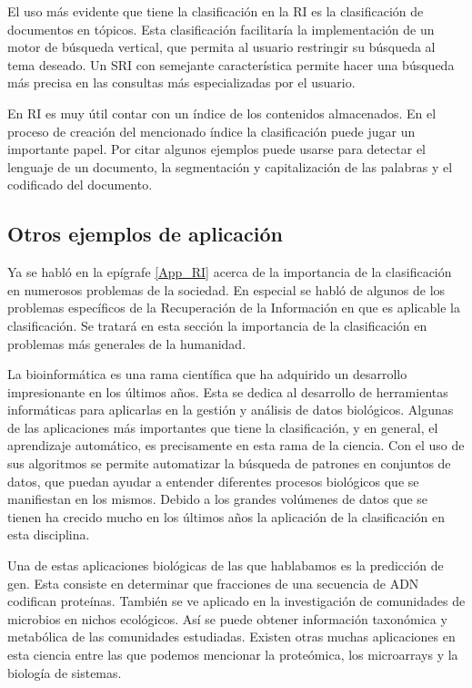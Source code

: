 \documentclass{llncs}
\begin{document}
		El uso m\'as evidente que tiene la clasificaci\'on en la RI es la clasificaci\'on de documentos en t\'opicos. Esta clasificaci\'on facilitar\'ia la implementaci\'on de un motor de b\'usqueda vertical, que permita al usuario restringir su b\'usqueda al tema deseado. Un SRI con semejante caracter\'istica permite hacer una b\'usqueda m\'as precisa en las consultas m\'as especializadas por el usuario.
		
		En RI es muy \'util contar con un \'indice de los contenidos almacenados. En el proceso de creaci\'on del mencionado \'indice la clasificaci\'on puede jugar un importante papel. Por citar algunos ejemplos puede usarse para detectar el lenguaje de un documento, la segmentaci\'on y capitalizaci\'on de las palabras y el codificado del documento.
		

	\subsection{Otros ejemplos de aplicaci\'on}

Ya se habl\'o en la ep\'igrafe \ref{App_RI} acerca de la importancia de la clasificaci\'on en numerosos problemas de la sociedad. En especial se habl\'o de algunos de los problemas espec\'ificos de la Recuperaci\'on de la Informaci\'on en que es aplicable la clasificaci\'on. Se tratar\'a en esta secci\'on la importancia de la clasificaci\'on en problemas m\'as generales de la humanidad.

La bioinform\'atica es una rama cient\'ifica que ha adquirido un desarrollo impresionante en los \'ultimos a\~nos. Esta se dedica al desarrollo de herramientas inform\'aticas para aplicarlas en la gesti\'on y an\'alisis de datos biol\'ogicos. Algunas  de las aplicaciones m\'as importantes que tiene la clasificaci\'on, y en general, el aprendizaje autom\'atico, es precisamente en esta rama de la ciencia. Con el uso de sus algoritmos se permite automatizar la b\'usqueda de patrones en conjuntos de datos, que puedan ayudar a entender diferentes procesos biol\'ogicos que se manifiestan en los mismos. Debido a los grandes vol\'umenes de datos que se tienen ha crecido mucho en los \'ultimos a\~nos la aplicaci\'on de la clasificaci\'on en esta disciplina.

Una de estas aplicaciones biol\'ogicas de las que hablabamos es la predicci\'on de gen. Esta consiste en determinar que fracciones de una secuencia de ADN codifican prote\'inas. Tambi\'en se ve aplicado en la investigaci\'on de comunidades de microbios en nichos ecol\'ogicos. As\'i se puede obtener informaci\'on taxon\'omica y metab\'olica de las comunidades estudiadas. Existen otras muchas aplicaciones en esta ciencia entre las que podemos mencionar la prote\'omica, los microarrays y la biolog\'ia de sistemas.
\end{document}
